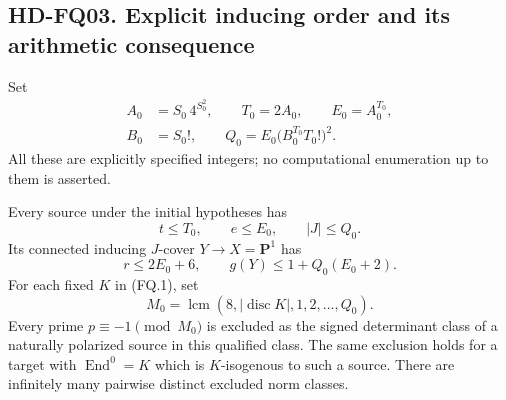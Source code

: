 \subsection*{HD-FQ03. Explicit inducing order and its arithmetic consequence}

Set
\[
 \begin{split}
 A_0&=S_0\,4^{S_0^2},\qquad T_0=2A_0,\qquad E_0=A_0^{T_0},\\
 B_0&=S_0!,\qquad
 Q_0=E_0\bigl(B_0^{T_0}T_0!\bigr)^2.
 \end{split}                                                   \tag{FQ.10}
\]
All these are explicitly specified integers; no computational
enumeration up to them is asserted.

\begin{theorem}[HD-FQ03]
Every source under the initial hypotheses has
\[
                 t\le T_0,\qquad e\le E_0,\qquad |J|\le Q_0.
                                                               \tag{FQ.11}
\]
Its connected inducing $J$-cover $Y\to X=\mathbf P^1$ has
\[
                  r\le2E_0+6,\qquad
                  g(Y)\le1+Q_0(E_0+2).
                                                               \tag{FQ.12}
\]
For each fixed $K$ in (FQ.1), set
\[
                M_0=\operatorname{lcm}(8,|\operatorname{disc}K|,
                                      1,2,\ldots,Q_0).
                                                               \tag{FQ.13}
\]
Every prime $p\equiv-1\pmod{M_0}$ is excluded as the signed
determinant class of a naturally polarized source in this qualified
class.  The same exclusion holds for a target with
$\operatorname{End}^0=K$ which is $K$-isogenous to such a source.
There are infinitely many pairwise distinct excluded norm classes.
\end{theorem}

